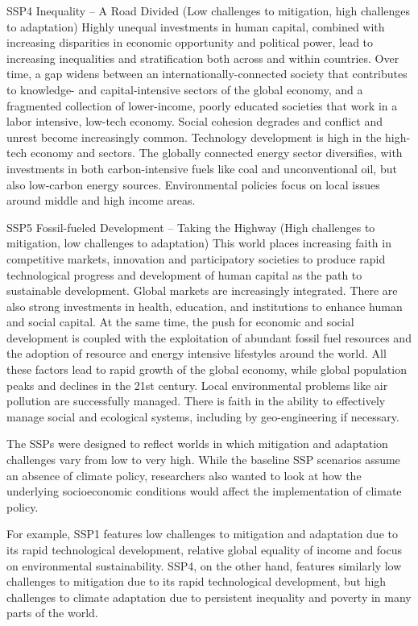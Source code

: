 \documentclass[
]{book}
\begin{document}
SSP4 Inequality -- A Road Divided (Low challenges to mitigation, high challenges to adaptation)
Highly unequal investments in human capital, combined with increasing disparities in economic opportunity and political power, lead to increasing inequalities and stratification both across and within countries. Over time, a gap widens between an internationally-connected society that contributes to knowledge- and capital-intensive sectors of the global economy, and a fragmented collection of lower-income, poorly educated societies that work in a labor intensive, low-tech economy. Social cohesion degrades and conflict and unrest become increasingly common. Technology development is high in the high-tech economy and sectors. The globally connected energy sector diversifies, with investments in both carbon-intensive fuels like coal and unconventional oil, but also low-carbon energy sources. Environmental policies focus on local issues around middle and high income areas.

SSP5 Fossil-fueled Development -- Taking the Highway (High challenges to mitigation, low challenges to adaptation)
This world places increasing faith in competitive markets, innovation and participatory societies to produce rapid technological progress and development of human capital as the path to sustainable development. Global markets are increasingly integrated. There are also strong investments in health, education, and institutions to enhance human and social capital. At the same time, the push for economic and social development is coupled with the exploitation of abundant fossil fuel resources and the adoption of resource and energy intensive lifestyles around the world. All these factors lead to rapid growth of the global economy, while global population peaks and declines in the 21st century. Local environmental problems like air pollution are successfully managed. There is faith in the ability to effectively manage social and ecological systems, including by geo-engineering if necessary.

The SSPs were designed to reflect worlds in which mitigation and adaptation challenges vary from low to very high. While the baseline SSP scenarios assume an absence of climate policy, researchers also wanted to look at how the underlying socioeconomic conditions would affect the implementation of climate policy.

For example, SSP1 features low challenges to mitigation and adaptation due to its rapid technological development, relative global equality of income and focus on environmental sustainability. SSP4, on the other hand, features similarly low challenges to mitigation due to its rapid technological development, but high challenges to climate adaptation due to persistent inequality and poverty in many parts of the world.
\end{document}
